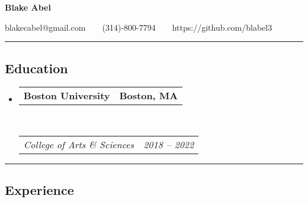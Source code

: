 \documentclass[11pt,letterpaper]{article}
\makeatletter
\newcommand{\headerrow}[2]
{\begin{tabular*}{\linewidth}{l@{\extracolsep{\fill}}r}
	#1 &
	#2 \\
\end{tabular*}}
\makeatother
\begin{document}
\begin{center}
{\LARGE \textbf{Blake Abel}}

blakecabel@gmail.com\ \ \textbullet \ \ (314)-800-7794\ \ \textbullet \ \ https://github.com/blabel3

\end{center}

\hrule
\vspace{-0.4em}
\subsection*{Education}

\begin{itemize}
	\parskip=0.1em

	\item 
	\headerrow
		{\textbf{Boston University}}
		{\textbf{Boston, MA}}
	\\
	\headerrow
		{\emph{College of Arts \& Sciences}}
		{\emph{2018 -- 2022}}

\end{itemize}

\hrule
\vspace{-0.4em}
\subsection*{Experience}
\end{document}
